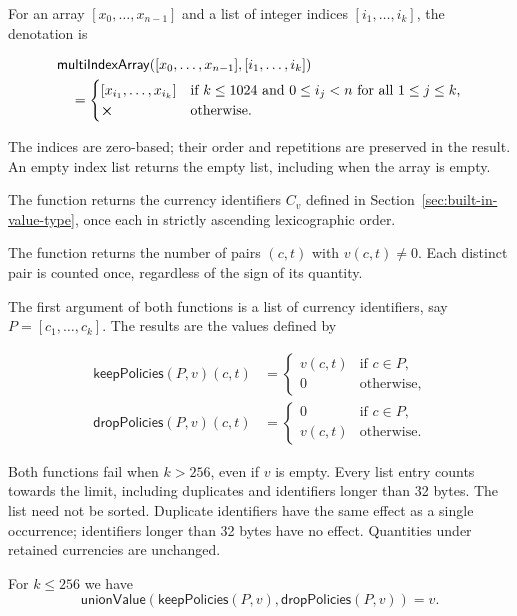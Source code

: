 \label{note:multiIndexArray-semantics}
For an array $[x_0,\ldots,x_{n-1}]$ and a list of integer indices $[i_1,\ldots,i_k]$, the denotation is

\[
\begin{aligned}
&\mathsf{multiIndexArray}([x_0,\ldots,x_{n-1}],[i_1,\ldots,i_k])\\
&\quad=\begin{cases}
  [x_{i_1},\ldots,x_{i_k}]
    & \text{if $k\leq 1024$ and $0\leq i_j<n$ for all $1\leq j\leq k$,}\\
  \errorX & \text{otherwise.}
\end{cases}
\end{aligned}
\]

\noindent
The indices are zero-based; their order and repetitions are preserved in the result.
An empty index list returns the empty list, including when the array is empty.

\label{note:policies-semantics}
The function returns the currency identifiers $C_v$ defined in Section~\ref{sec:built-in-value-type}, once each in strictly ascending lexicographic order.

\label{note:assetCount-semantics}
The function returns the number of pairs $(c,t)$ with $v(c,t)\ne 0$.
Each distinct pair is counted once, regardless of the sign of its quantity.

\label{note:policy-filter-semantics}
The first argument of both functions is a list of currency identifiers, say $P=[c_1,\ldots,c_k]$.
The results are the values defined by

\[
\begin{aligned}
  \mathsf{keepPolicies}(P,v)(c,t)
    &= \begin{cases}v(c,t)&\text{if }c\in P,\\0&\text{otherwise,}\end{cases}\\
  \mathsf{dropPolicies}(P,v)(c,t)
    &= \begin{cases}0&\text{if }c\in P,\\v(c,t)&\text{otherwise.}\end{cases}
\end{aligned}
\]

\noindent
Both functions fail when $k>256$, even if $v$ is empty.
Every list entry counts towards the limit, including duplicates and identifiers longer than 32 bytes.
The list need not be sorted.
Duplicate identifiers have the same effect as a single occurrence; identifiers longer than 32 bytes have no effect.
Quantities under retained currencies are unchanged.

For $k\leq 256$ we have
\[
  \mathsf{unionValue}(\mathsf{keepPolicies}(P,v),\mathsf{dropPolicies}(P,v)) = v.
\]
